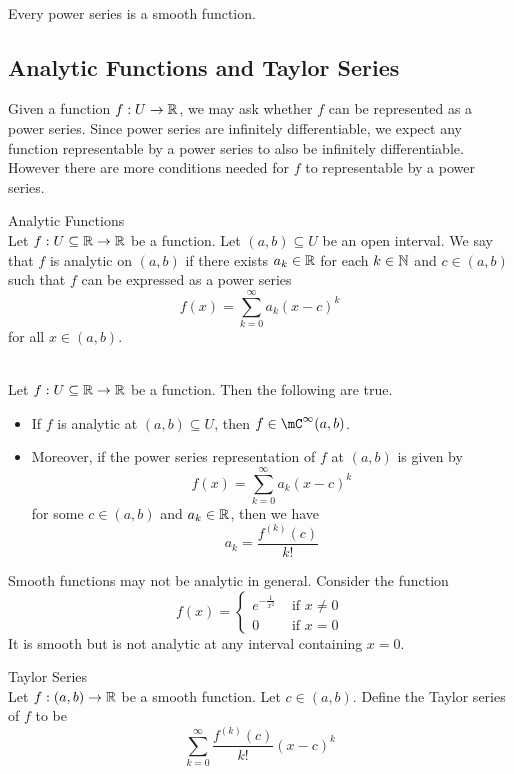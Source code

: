 \documentclass[a4paper]{article}
\begin{document}
\begin{lmm}{}{}\\ Every power series is a smooth function. 
\end{lmm}

\subsection{Analytic Functions and Taylor Series}
Given a function $f:U\to\mathbb{R}$, we may ask whether $f$ can be represented as a power series. Since power series are infinitely differentiable, we expect any function representable by a power series to also be infinitely differentiable. However there are more conditions needed for $f$ to representable by a power series. 

\begin{defn}{Analytic Functions}{}\\ Let $f:U\subseteq\mathbb{R}\to\mathbb{R}$ be a function. Let $(a,b)\subseteq U$ be an open interval. We say that $f$ is analytic on $(a,b)$ if there exists $a_k\in\mathbb{R}$ for each $k\in\mathbb{N}$ and $c\in(a,b)$ such that $f$ can be expressed as a power series $$f(x)=\sum_{k=0}^\infty a_k(x-c)^k$$ for all $x\in(a,b)$. 
\end{defn}

\begin{prp}{}{}\\ Let $f:U\subseteq\mathbb{R}\to\mathbb{R}$ be a function. Then the following are true. 
\begin{itemize}
\item If $f$ is analytic at $(a,b)\subseteq U$, then $f\in\mC^\infty(a,b)$. 
\item Moreover, if the power series representation of $f$ at $(a,b)$ is given by $$f(x)=\sum_{k=0}^\infty a_k(x-c)^k$$ for some $c\in(a,b)$ and $a_k\in\mathbb{R}$, then we have $$a_k=\frac{f^{(k)}(c)}{k!}$$
\end{itemize}
\end{prp}

Smooth functions may not be analytic in general. Consider the function $$f(x)=\begin{cases}
e^{-\frac{1}{x^2}} & \text{ if }x\neq 0\\
0 & \text{ if } x=0
\end{cases}$$
It is smooth but is not analytic at any interval containing $x=0$. 

\begin{defn}{Taylor Series}{}\\ Let $f:(a,b)\to\mathbb{R}$ be a smooth function. Let $c\in(a,b)$. Define the Taylor series of $f$ to be $$\sum_{k=0}^{\infty}\frac{f^{(k)}(c)}{k!}(x-c)^k$$
\end{defn}
\end{document}
